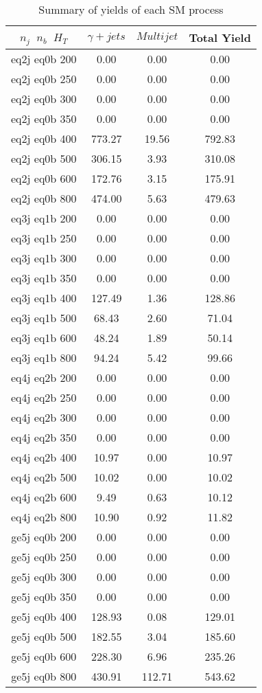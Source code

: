 \begin{longtable}{| c | c | c | c  | }
\caption{Summary of yields of each SM process} \label{tab:table} \\    \hline 
$n_{j}$~$n_{b}$~$H_{T}$ & $\gamma+jets$ & $Multijet$ & Total Yield\\ \hline 
eq2j eq0b 200 & 0.00 & 0.00 & 0.00\\ \hline 
eq2j eq0b 250 & 0.00 & 0.00 & 0.00\\ \hline 
eq2j eq0b 300 & 0.00 & 0.00 & 0.00\\ \hline 
eq2j eq0b 350 & 0.00 & 0.00 & 0.00\\ \hline 
eq2j eq0b 400 & 773.27 & 19.56 & 792.83\\ \hline 
eq2j eq0b 500 & 306.15 & 3.93 & 310.08\\ \hline 
eq2j eq0b 600 & 172.76 & 3.15 & 175.91\\ \hline 
eq2j eq0b 800 & 474.00 & 5.63 & 479.63\\ \hline 
eq3j eq1b 200 & 0.00 & 0.00 & 0.00\\ \hline 
eq3j eq1b 250 & 0.00 & 0.00 & 0.00\\ \hline 
eq3j eq1b 300 & 0.00 & 0.00 & 0.00\\ \hline 
eq3j eq1b 350 & 0.00 & 0.00 & 0.00\\ \hline 
eq3j eq1b 400 & 127.49 & 1.36 & 128.86\\ \hline 
eq3j eq1b 500 & 68.43 & 2.60 & 71.04\\ \hline 
eq3j eq1b 600 & 48.24 & 1.89 & 50.14\\ \hline 
eq3j eq1b 800 & 94.24 & 5.42 & 99.66\\ \hline 
eq4j eq2b 200 & 0.00 & 0.00 & 0.00\\ \hline 
eq4j eq2b 250 & 0.00 & 0.00 & 0.00\\ \hline 
eq4j eq2b 300 & 0.00 & 0.00 & 0.00\\ \hline 
eq4j eq2b 350 & 0.00 & 0.00 & 0.00\\ \hline 
eq4j eq2b 400 & 10.97 & 0.00 & 10.97\\ \hline 
eq4j eq2b 500 & 10.02 & 0.00 & 10.02\\ \hline 
eq4j eq2b 600 & 9.49 & 0.63 & 10.12\\ \hline 
eq4j eq2b 800 & 10.90 & 0.92 & 11.82\\ \hline 
ge5j eq0b 200 & 0.00 & 0.00 & 0.00\\ \hline 
ge5j eq0b 250 & 0.00 & 0.00 & 0.00\\ \hline 
ge5j eq0b 300 & 0.00 & 0.00 & 0.00\\ \hline 
ge5j eq0b 350 & 0.00 & 0.00 & 0.00\\ \hline 
ge5j eq0b 400 & 128.93 & 0.08 & 129.01\\ \hline 
ge5j eq0b 500 & 182.55 & 3.04 & 185.60\\ \hline 
ge5j eq0b 600 & 228.30 & 6.96 & 235.26\\ \hline 
ge5j eq0b 800 & 430.91 & 112.71 & 543.62\\ \hline 
    \hline 
    \hline 
\end{longtable}
